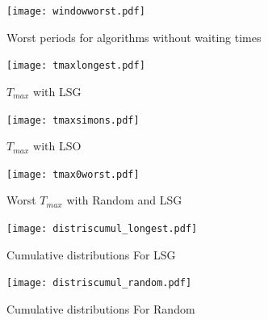 \documentclass[a4paper,10pt]{report}
\begin{document}
 
\begin{figure}[H]
\hspace*{-3cm}
\centering
\texttt{[image: windowworst.pdf]}%
\caption{Worst periods for algorithms without waiting times}
\end{figure}

\begin{figure}[H]
\hspace*{-3cm}
\centering
\texttt{[image: tmaxlongest.pdf]}%
\caption{$T_{max}$ with LSG}
\end{figure}

\begin{figure}[H]
\hspace*{-3cm}
\centering
\texttt{[image: tmaxsimons.pdf]}%
\caption{$T_{max}$ with LSO}
\end{figure}


\begin{figure}[H]
\hspace*{-3cm}
\centering
\texttt{[image: tmax0worst.pdf]}%
\caption{Worst $T_{max}$ with Random and LSG}
\end{figure}


\begin{figure}[H]
\hspace*{-3cm}
\centering
\texttt{[image: distriscumul\_longest.pdf]}%
\caption{Cumulative distributions For LSG}
\end{figure}

\begin{figure}[H]
\hspace*{-3cm}
\centering
\texttt{[image: distriscumul\_random.pdf]}%
\caption{Cumulative distributions For Random}
\end{figure}




\end{document}
